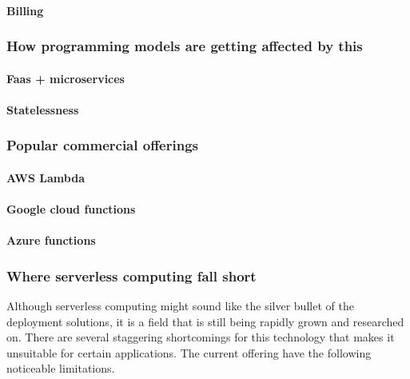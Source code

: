 \documentclass[12pt]{article}
\begin{document}
\paragraph{Billing}
\label{sec:orgbf8a486}

\subsubsection{How programming models are getting affected by this}
\label{sec:orgbcecd9c}
\paragraph{Faas + microservices}
\label{sec:org6f86f64}
\paragraph{Statelessness}
\label{sec:org3d8e735}
\subsubsection{Popular commercial offerings}
\label{sec:org1bf77de}
\paragraph{AWS Lambda}
\label{sec:orgf228bc7}
\paragraph{Google cloud functions}
\label{sec:org66916e5}
\paragraph{Azure functions}
\label{sec:org1f1da8a}
\subsubsection{Where serverless computing fall short}
\label{sec:orgba8f852}
Although serverless computing might sound like the silver bullet of the
deployment solutions, it is a field that is still being rapidly grown and
researched on. There are several staggering shortcomings for this technology
that makes it unsuitable for certain applications. The current offering have the
following noticeable limitations.
\end{document}
